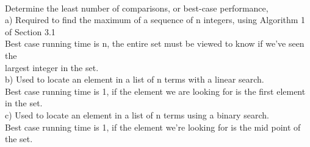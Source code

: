 \documentclass{article}
\begin{document}
\begin{flushleft}
~\\
\setlength\parindent{0pt} Determine the least number of comparisons, or best-case performance, \\
\setlength\parindent{24pt}a) Required to find the maximum of a sequence of n integers, using Algorithm 1 of Section 3.1 \\
\setlength\parindent{48pt} Best case running time is n, the entire set must be viewed to know if we've seen the\\ largest integer in the set. \\
\setlength\parindent{24pt}b) Used to locate an element in a list of n terms with a linear search. \\
\setlength\parindent{48pt} Best case running time is 1, if the element we are looking for is the first element in the set. \\
\setlength\parindent{24pt}c) Used to locate an element in a list of n terms using a binary search. \\
\setlength\parindent{48pt} Best case running time is 1, if the element we're looking for is the mid point of the set. \\ 
\end{flushleft}
\end{document}

